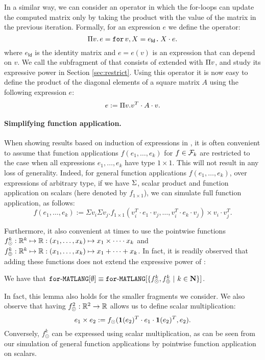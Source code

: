 \medskip

In a similar way, we can consider an operator in which the for-loops can update the computed matrix only by taking the product with the value of the matrix in the previous iteration. Formally, for an expression $e$ we define the operator:
$$
\Pi v.\,  e=\texttt{for}\, v,X = e_{\mathsf{Id}} \texttt{.}\, X\cdot e.
$$
where $e_{\mathsf{Id}}$ is the identity matrix and $e=e(v)$ is an expression that can depend on $v$. We call \langmprod the subfragment of \langfor that consists of \langsum extended with $\Pi v$, and study its expressive power in Section \ref{sec:restrict}. Using this operator it is now easy to define the product of the diagonal elements of a square matrix $A$ using the following expression $e$:
$$
e := \Pi v. v^T\cdot A \cdot v.
$$

\paragraph{Simplifying function application.} When showing results based on induction of expressions in \langfor, it is often convenient to assume that function applications $f(e_1,\ldots,e_k)$ for $f\in\mathcal{F}_k$ are restricted to
the case when all expressions $e_1,\ldots,e_k$ have type $1\times 1$. This will not result in any loss of generality. Indeed,
for general function applications $f(e_1,\ldots,e_k)$, over expressions of arbitrary type, if we have $\Sigma$, scalar product and function application on scalars (here denoted by $f_{1\times 1}$), we can simulate full function application, as follows:
 $$
f(e_1,\ldots, e_k) :=\Sigma v_i \Sigma v_j. f_{1\times 1}(v_i^T\cdot e_1\cdot v_j, \ldots ,v_i^T\cdot e_k\cdot v_j) \times v_i\cdot v_j^T.
$$

Furthermore, it also convenient at times to use the pointwise functions
$f_\odot^k:\mathbb{R}^k\mapsto \mathbb{R}:(x_1,\ldots,x_k)\mapsto x_1\times\cdots \cdot x_k$ and 
$f_\oplus^k:\mathbb{R}^k\mapsto \mathbb{R}:(x_1,\ldots,x_k)\mapsto x_1+\cdots + x_k$. In fact, it is readily observed that adding these functions does not extend the expressive power of \langfor:
\begin{lemma}
\label{lm-prod-sum}
We have that $\texttt{for}\text{-}\texttt{MATLANG}[\emptyset] \equiv \texttt{for}\text{-}\texttt{MATLANG}[\{f_\odot^k,f_\oplus^k \ | \ k\in \mathbf{N}\}]$.
\end{lemma}
In fact, this lemma also holds for the smaller fragments we consider.
%
We also observe that having $f_\odot^2:\mathbb{R}^2\to\mathbb{R}$ allows us to define scalar multiplication:
$$
e_1\times e_2 :=f_{\odot}(\mathbf{1}(e_2)^T\cdot e_1 \cdot \mathbf{1}(e_2)^T, e_2).
$$
Conversely, $f_\odot^k$ can be expressed using scalar multiplication, as can be seen from our simulation of general function applications by pointwise function application on scalars.


